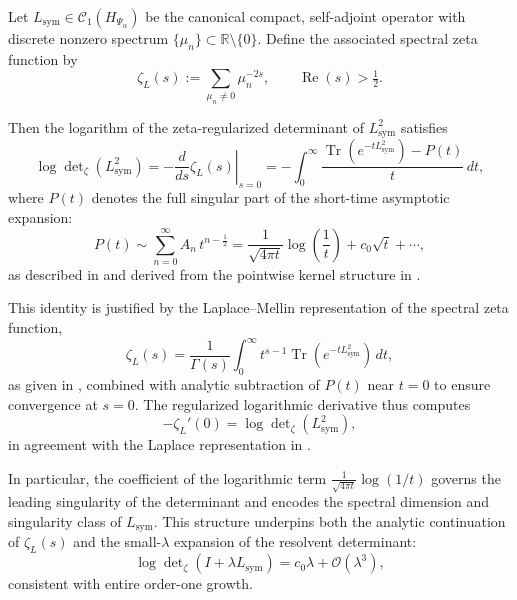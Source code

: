 \begin{lemma}
\label{lem:log_derivative_determinant}
Let \( L_{\mathrm{sym}} \in \mathcal{C}_1(H_{\Psi_\alpha}) \) be the canonical compact, self-adjoint operator with discrete nonzero spectrum \( \{ \mu_n \} \subset \mathbb{R} \setminus \{0\} \). Define the associated spectral zeta function by
\[
\zeta_L(s) := \sum_{\mu_n \neq 0} \mu_n^{-2s}, \qquad \operatorname{Re}(s) > \tfrac{1}{2}.
\]

Then the logarithm of the zeta-regularized determinant of \( L_{\mathrm{sym}}^2 \) satisfies
\[
\log \det\nolimits_{\zeta}(L_{\mathrm{sym}}^2)
= -\left. \frac{d}{ds} \zeta_L(s) \right|_{s=0}
= -\int_0^\infty \frac{\operatorname{Tr}(e^{-t L_{\mathrm{sym}}^2}) - P(t)}{t} \, dt,
\]
where \( P(t) \) denotes the full singular part of the short-time asymptotic expansion:
\[
P(t) \sim \sum_{n=0}^\infty A_n\, t^{n - \frac{1}{2}} = \frac{1}{\sqrt{4\pi t}} \log\left( \frac{1}{t} \right) + c_0 \sqrt{t} + \cdots,
\]
as described in  and derived from the pointwise kernel structure in .

\medskip
\noindent
This identity is justified by the Laplace–Mellin representation of the spectral zeta function,
\[
\zeta_L(s) = \frac{1}{\Gamma(s)} \int_0^\infty t^{s-1} \operatorname{Tr}(e^{-t L_{\mathrm{sym}}^2}) \, dt,
\]
as given in , combined with analytic subtraction of \( P(t) \) near \( t = 0 \) to ensure convergence at \( s = 0 \). The regularized logarithmic derivative thus computes
\[
-\zeta_L'(0) = \log \det\nolimits_\zeta(L_{\mathrm{sym}}^2),
\]
in agreement with the Laplace representation in .

\medskip
\noindent
In particular, the coefficient of the logarithmic term \( \frac{1}{\sqrt{4\pi t}} \log(1/t) \) governs the leading singularity of the determinant and encodes the spectral dimension and singularity class of \( L_{\mathrm{sym}} \). This structure underpins both the analytic continuation of \( \zeta_L(s) \) and the small-\( \lambda \) expansion of the resolvent determinant:
\[
\log \det\nolimits_{\zeta}(I + \lambda L_{\mathrm{sym}}) = c_0 \lambda + \mathcal{O}(\lambda^3),
\]
consistent with entire order-one growth.
\end{lemma}
